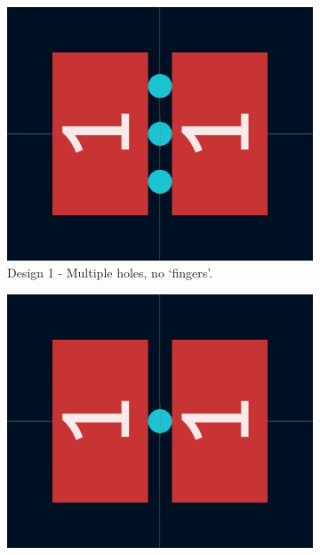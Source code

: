 \begin{figure}
    \centering
    \begin{subfigure}[b]{0.475\textwidth}
        \centering
        \includegraphics[width=\textwidth]{chapter_4/figures/SSR_CAD_hole_1.png}
        \caption[]%
        {{\small Design 1 - Multiple holes, no `fingers'.}}    
        \label{fig:design_1}
    \end{subfigure}
    \hfill
    \begin{subfigure}[b]{0.475\textwidth}  
        \centering 
        \includegraphics[width=\textwidth]{chapter_4/figures/SSR_CAD_hole_2.png}

\end{subfigure}
\end{figure}

